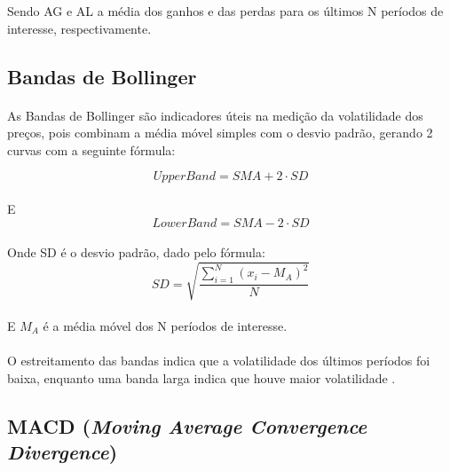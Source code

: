 \documentclass[grad,numbers]{coppe}
\begin{document}
            Sendo AG e AL a média dos ganhos e das perdas para os últimos N períodos de interesse, respectivamente.
            
          
        \subsection{Bandas de Bollinger}
            \paragraph{}As Bandas de Bollinger são indicadores úteis na medição da volatilidade dos preços, pois combinam a média móvel simples com o desvio padrão, gerando 2 curvas com a seguinte fórmula:
            
            \begin{equation}
                UpperBand = SMA + 2 \cdot SD
            \end{equation}
            \paragraph{}E
            \begin{equation}
                LowerBand = SMA - 2 \cdot SD
            \end{equation}
            \paragraph{}Onde SD é o desvio padrão, dado pelo fórmula:
            \begin{equation} \label{eq:sd}
                SD = \sqrt{\frac{\sum_{i=1}^{N} (x_i - M_A)^2}{N}}
            \end{equation}
            \paragraph{}E $M_A$ é a média móvel dos N períodos de interesse.
            \paragraph{}O estreitamento das bandas indica que a volatilidade dos últimos períodos foi baixa, enquanto uma banda larga indica que houve maior volatilidade \cite{bollinger-indicator}.
            
        \subsection{MACD (\textit{Moving Average Convergence Divergence})}
\end{document}
